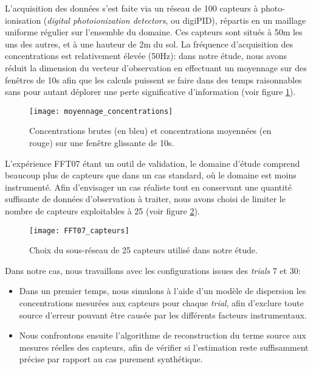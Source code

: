 L'acquisition des données s'est faite via un réseau de 100 capteurs à photo-ionisation (\textit{digital photoionization detectors}, ou digiPID), répartis en un maillage uniforme régulier sur l'ensemble du domaine. Ces capteurs sont situés à 50m les uns des autres, et à une hauteur de 2m du sol. La fréquence d'acquisition des concentrations est relativement élevée (50Hz): dans notre étude, nous avons réduit la dimension du vecteur d'observation en effectuant un moyennage sur des fenêtres de 10s afin que les calculs puissent se faire dans des temps raisonnables sans pour autant déplorer une perte significative d'information (voir figure \ref{fig_AE_3}).

\begin{figure}[h!]
	\centering
	\texttt{[image: moyennage\_concentrations]}
	\caption{Concentrations brutes (en bleu) et concentrations moyennées (en rouge) sur une fenêtre glissante de 10s. }
	\label{fig_AE_3}
\end{figure}


L'expérience FFT07 étant un outil de validation, le domaine d'étude comprend beaucoup plus de capteurs que dans un cas standard, où le domaine est moins instrumenté. Afin d'envisager un cas réaliste tout en conservant une quantité suffisante de données d'observation à traiter, nous avons choisi de limiter le nombre de capteurs exploitables à 25 (voir figure \ref{fig_AE_4}).

\begin{figure}[h!]
	\centering
	\texttt{[image: FFT07\_capteurs]}
	\caption{Choix du sous-réseau de 25 capteurs utilisé dans notre étude.}
	\label{fig_AE_4}
\end{figure}

Dans notre cas, nous travaillons avec les configurations issues des \textit{trials} 7 et 30: 
\begin{itemize}
	\item Dans un premier temps, nous simulons à l'aide d'un modèle de dispersion les concentrations mesurées aux capteurs pour chaque \textit{trial}, afin d'exclure toute source d'erreur pouvant être causée par les différents facteurs instrumentaux.
	\item Nous confrontons ensuite l'algorithme de reconstruction du terme source aux mesures réelles des capteurs, afin de vérifier si l'estimation reste suffisamment précise par rapport au cas purement synthétique.
\end{itemize}



